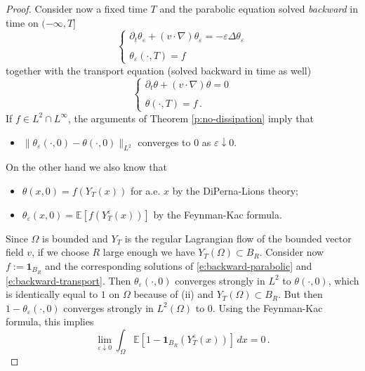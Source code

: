 \documentclass[11pt,reqno]{amsart}
\theoremstyle{definition}
\numberwithin{equation}{section}
\begin{document}
\begin{proof}
Consider now a fixed time $T$ and the parabolic equation solved {\em backward} in time on $(-\infty, T]$
\begin{equation}\label{e:backward-parabolic}
\left\{
\begin{array}{ll}
\partial_t \theta_\varepsilon + (v\cdot \nabla) \theta_\varepsilon = - \varepsilon \Delta \theta_\varepsilon\\ \\
\theta_\varepsilon (\cdot, T) = f
\end{array}
\right.
\end{equation}
together with the transport equation (solved backward in time as well)
\begin{equation}\label{e:backward-transport}
\left\{
\begin{array}{ll}
\partial_t \theta + (v\cdot \nabla) \theta = 0 \\ \\
\theta (\cdot, T) = f\, .
\end{array}
\right.
\end{equation}
If $f \in L^2\cap L^\infty$, the arguments of Theorem \ref{p:no-dissipation} imply that 
\begin{itemize}
\item[(i)] $\|\theta_\varepsilon (\cdot, 0) - \theta (\cdot, 0)\|_{L^2}$ converges to $0$ as $\varepsilon\downarrow 0$.
\end{itemize}
On the other hand we also know that 
\begin{itemize}
\item[(ii)] $\theta (x,0) = f (Y_T (x))$ for a.e. $x$ by the DiPerna-Lions theory;
\item[(iii)] $\theta_\varepsilon (x,0) = {\mathbb E} [ f (Y_T^\varepsilon (x))]$ by the Feynman-Kac formula. 
\end{itemize}
Since $\Omega$ is bounded and $Y_T$ is the regular Lagrangian flow of the bounded vector field $v$, if we choose $R$ large enough we have $Y_T (\Omega) \subset B_R$. Consider now $f := \mathbf{1}_{B_R}$ and the corresponding solutions of \eqref{e:backward-parabolic} and \eqref{e:backward-transport}. Then $\theta_\varepsilon (\cdot, 0)$ converges strongly in $L^2$ to $\theta (\cdot, 0)$, which is identically equal to $1$ on $\Omega$ because of (ii) and $Y_T (\Omega) \subset B_R$. But then $1-\theta_\varepsilon (\cdot, 0)$ converges strongly in $L^2 (\Omega)$ to $0$. Using the Feynman-Kac formula, this implies
\begin{equation}\label{e:escaping}
\lim_{\varepsilon \downarrow 0} \int_\Omega \mathbb E[1-\mathbf{1}_{B_R} (Y_T^\varepsilon (x))]\, dx = 0\, .

\end{equation}
\end{proof}
\end{document}
